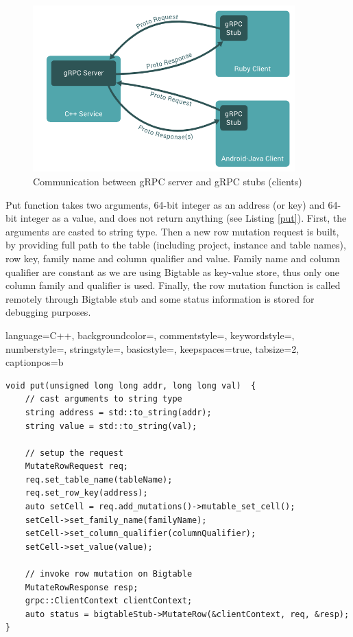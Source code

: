 \documentclass[bsc,frontabs,twoside,singlespacing,parskip,deptreport]{infthesis}     %
\begin{document}
\begin{figure}[H]
\centering
\includegraphics[width=0.9\textwidth]{images/grpc}
\caption{Communication between gRPC server and gRPC stubs (clients) \cite[source:][Guides page]{grpc}}
\label{fig:grpc}
\end{figure}

Put function takes two arguments, 64-bit integer as an address (or key) and 64-bit integer as a value, and does not return anything (see Listing \ref{put}). First, the arguments are casted to string type. Then a new row mutation request is built, by providing full path to the table (including project, instance and table names), row key, family name and column qualifier and value. Family name and column qualifier are constant as we are using Bigtable as key-value store, thus only one column family and qualifier is used. Finally, the row mutation function is called remotely through Bigtable stub and some status information is stored for debugging purposes.

 {
  language=C++,
  backgroundcolor=\color{backcolour},   
  commentstyle=\color{codegreen},
  keywordstyle=\color{Maroon},
  numberstyle=\tiny\color{codegray},
  stringstyle=\color{magenta},
  basicstyle=\footnotesize,                 
  keepspaces=true,                                           
  tabsize=2,
  captionpos=b
}

\begin{lstlisting}[caption=Writing content to Bigtable using put() function, label=put, style=block]
void put(unsigned long long addr, long long val)  {
	// cast arguments to string type
	string address = std::to_string(addr);
	string value = std::to_string(val);

	// setup the request
	MutateRowRequest req;
	req.set_table_name(tableName);
	req.set_row_key(address);
	auto setCell = req.add_mutations()->mutable_set_cell();
	setCell->set_family_name(familyName);
	setCell->set_column_qualifier(columnQualifier);
	setCell->set_value(value);

	// invoke row mutation on Bigtable
	MutateRowResponse resp;
	grpc::ClientContext clientContext;
	auto status = bigtableStub->MutateRow(&clientContext, req, &resp);
}
\end{lstlisting}
\end{document}
